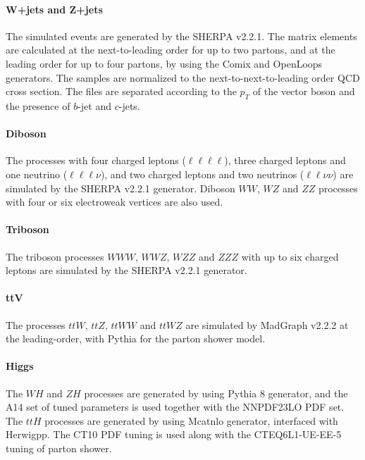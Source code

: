 \paragraph{\bf W+jets and Z+jets}
The simulated events are generated by the {\sc SHERPA} v2.2.1.
The matrix elements are calculated at the next-to-leading order for up to two partons, and at the leading order for up to four partons, by using the {\sc Comix} and {\sc OpenLoops} generators.
The samples are normalized to the next-to-next-to-leading order QCD cross section.
The files are separated according to the $p_T$ of the vector boson and the presence of $b$-jet and $c$-jets.

\paragraph{\bf Diboson}
The processes with four charged leptons ($\ell \ell \ell \ell$), three charged leptons and one neutrino ($\ell \ell \ell \nu$), and two charged leptons and two neutrinos ($\ell \ell \nu \nu$) are simulated by the {\sc SHERPA} v2.2.1 generator.
Diboson $WW$, $WZ$ and $ZZ$ processes with four or six electroweak vertices are also used.

\paragraph{\bf Triboson}
The triboson processes $WWW$, $WWZ$, $WZZ$ and $ZZZ$ with up to six charged leptons are simulated by the {\sc SHERPA} v2.2.1 generator.

\paragraph{\bf ttV}
The processes $ttW$, $ttZ$, $ttWW$ and $ttWZ$ are simulated by {\sc MadGraph} v2.2.2 at the leading-order, with {\sc Pythia} for the parton shower model.

\paragraph{\bf Higgs}
The $WH$ and $ZH$ processes are generated by using {\sc Pythia} 8 generator, and the {\sc A14} set of tuned parameters is used together with the {\sc NNPDF23LO} PDF set.
The $ttH$ processes are generated by using {\sc Mcatnlo} generator, interfaced with {\sc Herwigpp}.
The CT10 PDF tuning is used along with the CTEQ6L1-UE-EE-5 tuning of parton shower.

